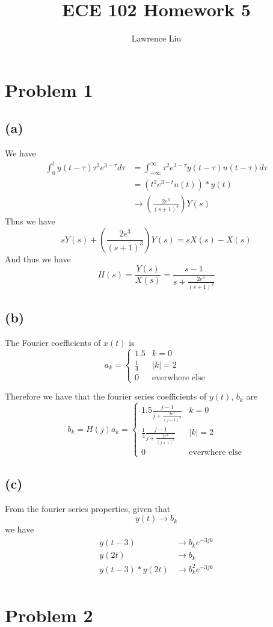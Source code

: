 \documentclass[12pt]{article}
\title{ECE 102 Homework 5}
\author{Lawrence Liu}
\begin{document}
\maketitle
\section{Problem 1}
\subsection*{(a)}
We have
\begin{align*}
\int_0^t y(t-\tau)\tau^2e^{3-\tau} d\tau &=\int_{-\infty}^{\infty}\tau^2e^{3-\tau}y(t-\tau)u(t-\tau)d\tau\\ 
&=\left(t^2e^{3-t}u(t)\right)*y(t)\\
&\to \left(\frac{2e^3}{(s+1)^3}\right)Y(s)
\end{align*}
Thus we have
$$sY(s)+\left(\frac{2e^3}{(s+1)^3}\right)Y(s)=sX(s)-X(s)$$
And thus we have
$$H(s)=\frac{Y(s)}{X(s)}=\frac{s-1}{s+\frac{2e^3}{(s+1)^3}}$$
\subsection*{(b)}
The Fourier coefficients of $x(t)$ is
$$a_k=\begin{cases}
1.5 & k=0\\
\frac{1}{4} & |k|=2\\
0 & \text{everwhere else}
\end{cases}
$$

Therefore we have that the fourier series coefficients of $y(t)$, $b_k$ are
$$b_k=H(j)a_k=\begin{cases}
1.5\frac{j-1}{j+\frac{2e^3}{(j+1)^3}}& k=0\\
\frac{1}{4}\frac{j-1}{j+\frac{2e^3}{(j+1)^3}} & |k|=2\\
0 & \text{everwhere else}
\end{cases}$$
\subsection*{(c)}
From the fourier series properties,  given that
$$y(t)\to b_k$$
we have
\begin{align*}
y(t-3) &\to b_k e^{-3jk}\\
y(2t) &\to b_k\\
y(t-3)*y(2t) &\to b_k^2 e^{-3jk}\\
\end{align*}
\section*{Problem 2}
\end{document}

